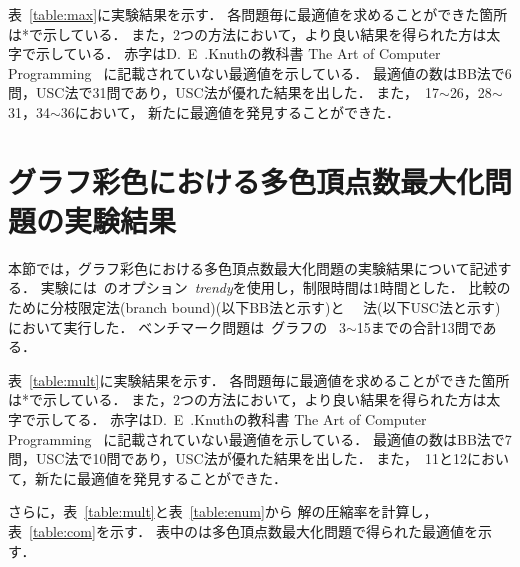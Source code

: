 表~\ref{table:max}に実験結果を示す．
各問題毎に最適値を求めることができた箇所は*で示している．
また，2つの方法において，より良い結果を得られた方は太字で示している．
赤字はD.~E~.Knuthの教科書
The Art of Computer Programming~\cite{Knuth:TAOCP:SAT}
に記載されていない最適値を示している．
最適値の数はBB法で6問，USC法で31問であり，USC法が優れた結果を出した．
また，~17$\sim$26，28$\sim$31，34$\sim$36において，
新たに最適値を発見することができた．

\section{グラフ彩色における多色頂点数最大化問題の実験結果}

本節では，グラフ彩色における多色頂点数最大化問題の実験結果について記述する．
実験には~{\clingo}のオプション~\textit{trendy}を使用し，制限時間は1時間とした．
比較のために分枝限定法(branch bound)(以下BB法と示す)と
~~法(以下USC法と示す)において実行した．
ベンチマーク問題は~グラフの
~3$\sim$15までの合計13問である．

表~\ref{table:mult}に実験結果を示す．
各問題毎に最適値を求めることができた箇所は*で示している．
また，2つの方法において，より良い結果を得られた方は太字で示してる．
赤字はD.~E~.Knuthの教科書
The Art of Computer Programming~\cite{Knuth:TAOCP:SAT}
に記載されていない最適値を示している．
最適値の数はBB法で7問，USC法で10問であり，USC法が優れた結果を出した．
また，~11と12において，新たに最適値を発見することができた．

さらに，表~\ref{table:mult}と表~\ref{table:enum}から
解の圧縮率を計算し，表~\ref{table:com}を示す．
表中のは多色頂点数最大化問題で得られた最適値を示す．



